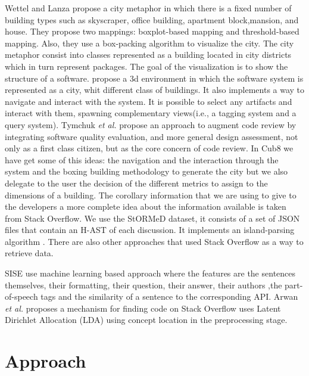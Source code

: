 \documentclass[]{usiinfbachelorproject}
\newcommand {\stormed}[0]{StORMeD\xspace}
\newcommand {\etal}[0]{\emph{et al.\xspace}}
\begin{document}
Wettel and Lanza \cite{programComp} propose a city metaphor in which there is a fixed number  of building types such as skyscraper, office building, apartment block,mansion, and house. They propose two mappings: boxplot-based mapping and threshold-based mapping. Also, they use a box-packing algorithm to visualize the city. The city metaphor consist into classes represented as a building located in city districts which in turn represent packages. The goal of the visualization is to show the structure of a software.  \cite{vssac}  propose a 3d environment in which the software system is represented as a city, whit different class of buildings. It also implements a way to navigate and interact with the system. It is possible to select any artifacts and interact with them, spawning complementary views(i.e., a tagging system and a query system).
Tymchuk \etal \cite{VVV} propose an approach to augment code review by integrating software quality evaluation, and more general design assessment, not only as a first class citizen, but as the core concern of code review.
In Cub8 we have  get some of this ideas: the navigation and the interaction through the system and the boxing building methodology to generate the city but we also delegate to the user the decision of  the different metrics to assign to the dimensions of a building.  
The corollary information that we are using to give to the developers a more complete idea about the information available is taken from Stack Overflow. We use the \stormed dataset, it consists of a set of JSON files that contain an H-AST of each discussion. It implements an island-parsing algorithm \cite{stormed}. There are also other approaches that used Stack Overflow as a  way to retrieve data.

SISE \cite{SISE}  use machine learning based approach where the features are the sentences themselves, their formatting, their question, their answer,  their authors ,the part-of-speech tags and the similarity of a sentence to the corresponding API.
Arwan \etal \cite{7231439}  proposes a mechanism for finding code on Stack Overflow uses Latent Dirichlet Allocation (LDA) using concept location in the preprocessing stage. 
 


\newpage
\section{Approach} \label{approach}
\end{document}
